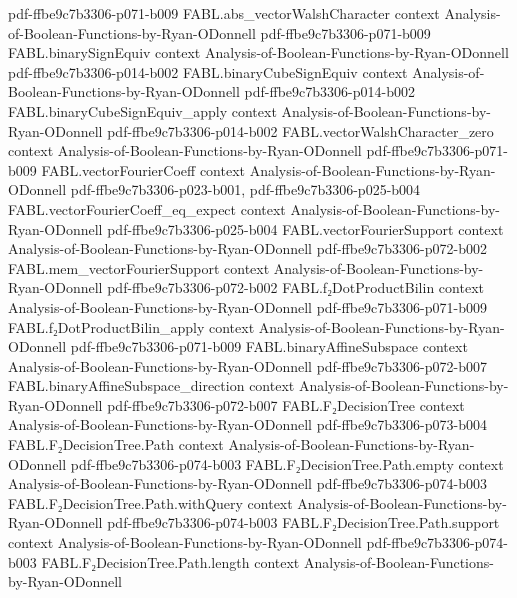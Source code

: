 \begin{theorem}
  {pdf-ffbe9c7b3306-p071-b009}
\proofstep
  {FABL.abs_vectorWalshCharacter}
  {context}
  {Analysis-of-Boolean-Functions-by-Ryan-ODonnell}
  {pdf-ffbe9c7b3306-p071-b009}
\proofstep
  {FABL.binarySignEquiv}
  {context}
  {Analysis-of-Boolean-Functions-by-Ryan-ODonnell}
  {pdf-ffbe9c7b3306-p014-b002}
\proofstep
  {FABL.binaryCubeSignEquiv}
  {context}
  {Analysis-of-Boolean-Functions-by-Ryan-ODonnell}
  {pdf-ffbe9c7b3306-p014-b002}
\proofstep
  {FABL.binaryCubeSignEquiv_apply}
  {context}
  {Analysis-of-Boolean-Functions-by-Ryan-ODonnell}
  {pdf-ffbe9c7b3306-p014-b002}
\proofstep
  {FABL.vectorWalshCharacter_zero}
  {context}
  {Analysis-of-Boolean-Functions-by-Ryan-ODonnell}
  {pdf-ffbe9c7b3306-p071-b009}
\proofstep
  {FABL.vectorFourierCoeff}
  {context}
  {Analysis-of-Boolean-Functions-by-Ryan-ODonnell}
  {pdf-ffbe9c7b3306-p023-b001,
    pdf-ffbe9c7b3306-p025-b004}
\proofstep
  {FABL.vectorFourierCoeff_eq_expect}
  {context}
  {Analysis-of-Boolean-Functions-by-Ryan-ODonnell}
  {pdf-ffbe9c7b3306-p025-b004}
\proofstep
  {FABL.vectorFourierSupport}
  {context}
  {Analysis-of-Boolean-Functions-by-Ryan-ODonnell}
  {pdf-ffbe9c7b3306-p072-b002}
\proofstep
  {FABL.mem_vectorFourierSupport}
  {context}
  {Analysis-of-Boolean-Functions-by-Ryan-ODonnell}
  {pdf-ffbe9c7b3306-p072-b002}
\proofstep
  {FABL.f₂DotProductBilin}
  {context}
  {Analysis-of-Boolean-Functions-by-Ryan-ODonnell}
  {pdf-ffbe9c7b3306-p071-b009}
\proofstep
  {FABL.f₂DotProductBilin_apply}
  {context}
  {Analysis-of-Boolean-Functions-by-Ryan-ODonnell}
  {pdf-ffbe9c7b3306-p071-b009}
\proofstep
  {FABL.binaryAffineSubspace}
  {context}
  {Analysis-of-Boolean-Functions-by-Ryan-ODonnell}
  {pdf-ffbe9c7b3306-p072-b007}
\proofstep
  {FABL.binaryAffineSubspace_direction}
  {context}
  {Analysis-of-Boolean-Functions-by-Ryan-ODonnell}
  {pdf-ffbe9c7b3306-p072-b007}
\proofstep
  {FABL.F₂DecisionTree}
  {context}
  {Analysis-of-Boolean-Functions-by-Ryan-ODonnell}
  {pdf-ffbe9c7b3306-p073-b004}
\proofstep
  {FABL.F₂DecisionTree.Path}
  {context}
  {Analysis-of-Boolean-Functions-by-Ryan-ODonnell}
  {pdf-ffbe9c7b3306-p074-b003}
\proofstep
  {FABL.F₂DecisionTree.Path.empty}
  {context}
  {Analysis-of-Boolean-Functions-by-Ryan-ODonnell}
  {pdf-ffbe9c7b3306-p074-b003}
\proofstep
  {FABL.F₂DecisionTree.Path.withQuery}
  {context}
  {Analysis-of-Boolean-Functions-by-Ryan-ODonnell}
  {pdf-ffbe9c7b3306-p074-b003}
\proofstep
  {FABL.F₂DecisionTree.Path.support}
  {context}
  {Analysis-of-Boolean-Functions-by-Ryan-ODonnell}
  {pdf-ffbe9c7b3306-p074-b003}
\proofstep
  {FABL.F₂DecisionTree.Path.length}
  {context}
  {Analysis-of-Boolean-Functions-by-Ryan-ODonnell}

\end{theorem}
